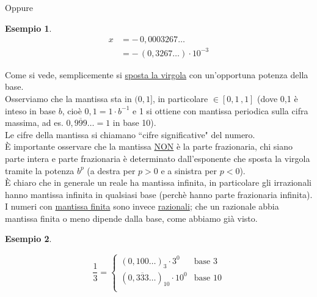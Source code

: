 \documentclass[12pt]{article}
\newtheorem*{esempio}{Esempio}
\begin{document}
Oppure
\begin{esempio}
\[\begin{split}
    x & = - \, 0,0003267 \dotsc \\
    & = - \, (0,3267 \dotsc) \cdot 10^{-3} 
\end{split}\]
\end{esempio}
Come si vede, semplicemente si \uline{sposta la virgola} con un'opportuna potenza della base. \\
Osserviamo che la mantissa sta in $(0,1]$, in particolare $\in [0,1 \, , 1]$ (dove 0,1 è inteso in base $b$, cioè $0,1 = 1 \cdot b^{-1}$ e 1 si ottiene con mantissa periodica sulla cifra massima, ad es. $0,\overline{999} \dotsc = 1$ in base 10). \\
Le cifre della mantissa si chiamano ``cifre significative" del numero. \\
È importante osservare che la mantissa \uline{NON} è la parte frazionaria, chi siano parte intera e parte frazionaria è determinato dall'esponente che sposta la virgola tramite la potenza $b^p$ (a destra per $p>0$ e a sinistra per $p<0$). \\
È chiaro che in generale un reale ha mantissa infinita, in particolare gli irrazionali hanno mantissa infinita in qualsiasi base (perchè hanno parte frazionaria infinita). \\
I numeri con \uline{mantissa finita} sono invece \uline{razionali}; che un razionale abbia mantissa finita o meno dipende dalla base, come abbiamo già visto.
\begin{esempio} \end{esempio}
\[\frac{1}{3} = 
\begin{cases}
    (0,100 \dotsc)_3 \cdot 3^0 & \text{base 3} \\
    (0,\overline{333} \dotsc)_{10} \cdot 10^0 & \text{base 10} \\
\end{cases}
\]
\end{document}
